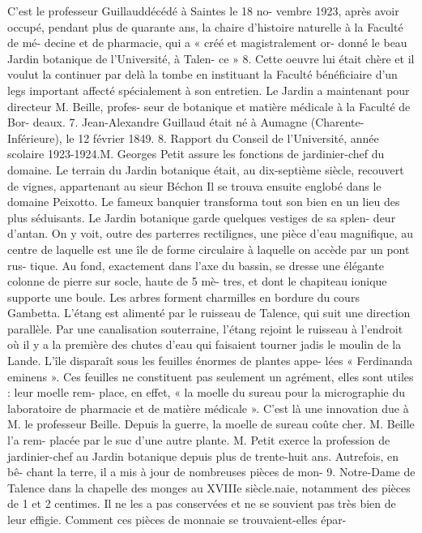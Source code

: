 \documentclass[a4paper,11pt]{book}
\begin{document}
C'est le professeur Guillauddécédé à Saintes le 18 no-
vembre 1923, après avoir occupé, pendant plus de quarante
ans, la chaire d'histoire naturelle à la Faculté de mé-
decine et de pharmacie, qui a « créé et magistralement or-
donné le beau Jardin botanique de l'Université, à Talen-
ce » 8. Cette oeuvre lui était chère et il voulut la continuer
par delà la tombe en instituant la Faculté bénéficiaire d'un
legs important affecté spécialement à son entretien.
Le Jardin a maintenant pour directeur M. Beille, profes-
seur de botanique et matière médicale à la Faculté de Bor-
deaux.
7. Jean-Alexandre Guillaud était né à Aumagne (Charente-Inférieure),
le 12 février 1849.
8. Rapport du Conseil de l'Université, année scolaire 1923-1924.M. Georges Petit assure les fonctions de jardinier-chef
du domaine.
Le terrain du Jardin botanique était, au dix-septième
siècle, recouvert de vignes, appartenant au sieur Béchon
Il se trouva ensuite englobé dans le domaine Peixotto. Le
fameux banquier transforma tout son bien en un lieu des
plus séduisants.
Le Jardin botanique garde quelques vestiges de sa splen-
deur d'antan. On y voit, outre des parterres rectilignes,
une pièce d'eau magnifique, au centre de laquelle est une
île de forme circulaire à laquelle on accède par un pont rus-
tique. Au fond, exactement dans l'axe du bassin, se dresse
une élégante colonne de pierre sur socle, haute de 5 mè-
tres, et dont le chapiteau ionique supporte une boule. Les
arbres forment charmilles en bordure du cours Gambetta.
L'étang est alimenté par le ruisseau de Talence, qui suit
une direction parallèle. Par une canalisation souterraine,
l'étang rejoint le ruisseau à l'endroit où il y a la première
des chutes d'eau qui faisaient tourner jadis le moulin de
la Lande.
L'île disparaît sous les feuilles énormes de plantes appe-
lées « Ferdinanda eminens ». Ces feuilles ne constituent pas
seulement un agrément, elles sont utiles : leur moelle rem-
place, en effet, « la moelle du sureau pour la micrographie
du laboratoire de pharmacie et de matière médicale ». C'est
là une innovation due à M. le professeur Beille. Depuis la
guerre, la moelle de sureau coûte cher. M. Beille l'a rem-
placée par le suc d'une autre plante.
M. Petit exerce la profession de jardinier-chef au Jardin
botanique depuis plus de trente-huit ans. Autrefois, en bê-
chant la terre, il a mis à jour de nombreuses pièces de mon-
9. Notre-Dame de Talence dans la chapelle des monges au XVIIIe siècle.naie, notamment des pièces de 1 et 2 centimes. Il ne les a
pas conservées et ne se souvient pas très bien de leur effigie.
Comment ces pièces de monnaie se trouvaient-elles épar-
\end{document}
